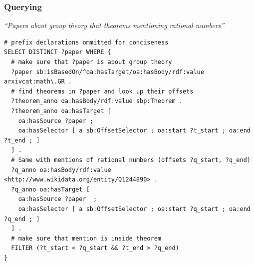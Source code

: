 \documentclass[aspectratio=169]{beamer}
\begin{document}
\begin{frame}[fragile]
    \frametitle{Querying}
    {\centering\itshape
    ``Papers about group theory that theorems mentioning rational numbers''
    \par}
    \footnotesize
\begin{lstlisting}[language=SPARQL]
# prefix declarations ommitted for conciseness
SELECT DISTINCT ?paper WHERE {
  # make sure that ?paper is about group theory
  ?paper sb:isBasedOn/^oa:hasTarget/oa:hasBody/rdf:value arxivcat:math\.GR .
  # find theorems in ?paper and look up their offsets
  ?theorem_anno oa:hasBody/rdf:value sbp:Theorem .
  ?theorem_anno oa:hasTarget [
    oa:hasSource ?paper ;
    oa:hasSelector [ a sb:OffsetSelector ; oa:start ?t_start ; oa:end ?t_end ; ]
  ] .
  # Same with mentions of rational numbers (offsets ?q_start, ?q_end)
  ?q_anno oa:hasBody/rdf:value <http://www.wikidata.org/entity/Q1244890> .
  ?q_anno oa:hasTarget [
    oa:hasSource ?paper  ;
    oa:hasSelector [ a sb:OffsetSelector ; oa:start ?q_start ; oa:end ?q_end ; ]
  ] .
  # make sure that mention is inside theorem
  FILTER (?t_start < ?q_start && ?t_end > ?q_end)
}
\end{lstlisting}

\end{frame}
\end{document}
